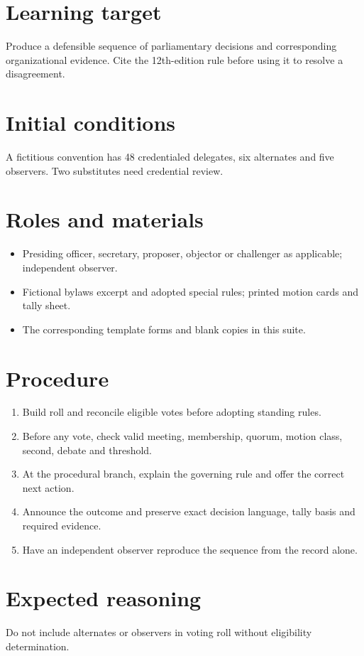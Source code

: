 \documentclass[11pt]{article}
\begin{document}
\SuiteOpen
\section{Learning target}
Produce a defensible sequence of parliamentary decisions and corresponding organizational evidence. Cite the 12th-edition rule before using it to resolve a disagreement.

\section{Initial conditions}
A fictitious convention has 48 credentialed delegates, six alternates and five observers. Two substitutes need credential review.

\section{Roles and materials}
\begin{itemize}[leftmargin=*,itemsep=4pt]
\item Presiding officer, secretary, proposer, objector or challenger as applicable; independent observer.
\item Fictional bylaws excerpt and adopted special rules; printed motion cards and tally sheet.
\item The corresponding template forms and blank copies in this suite.
\end{itemize}

\section{Procedure}
\begin{enumerate}[leftmargin=*,itemsep=4pt]
\item Build roll and reconcile eligible votes before adopting standing rules.
\item Before any vote, check valid meeting, membership, quorum, motion class, second, debate and threshold.
\item At the procedural branch, explain the governing rule and offer the correct next action.
\item Announce the outcome and preserve exact decision language, tally basis and required evidence.
\item Have an independent observer reproduce the sequence from the record alone.
\end{enumerate}

\section{Expected reasoning}
Do not include alternates or observers in voting roll without eligibility determination.
\end{document}

